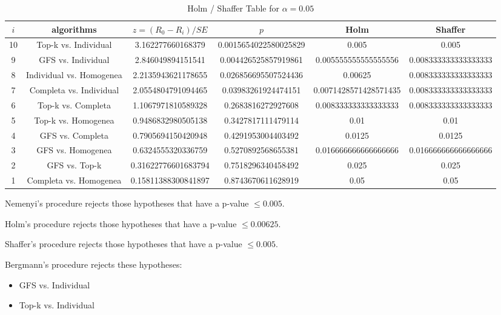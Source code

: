 \documentclass[a4paper,10pt]{article}
\begin{document}
\begin{landscape}
\begin{table}[!htp]
\centering\tiny
\caption{Holm / Shaffer Table for $\alpha=0.05$}
\begin{tabular}{cccccc}
$i$&algorithms&$z=(R_0 - R_i)/SE$&$p$&Holm&Shaffer\\
\hline
10&Top-k vs. Individual&3.162277660168379&0.0015654022580025829&0.005&0.005\\
9&GFS vs. Individual&2.846049894151541&0.004426525857919861&0.005555555555555556&0.008333333333333333\\
8&Individual vs. Homogenea&2.2135943621178655&0.026856695507524436&0.00625&0.008333333333333333\\
7&Completa vs. Individual&2.0554804791094465&0.03983261924474151&0.0071428571428571435&0.008333333333333333\\
6&Top-k vs. Completa&1.1067971810589328&0.2683816272927608&0.008333333333333333&0.008333333333333333\\
5&Top-k vs. Homogenea&0.9486832980505138&0.3427817111479114&0.01&0.01\\
4&GFS vs. Completa&0.7905694150420948&0.4291953004403492&0.0125&0.0125\\
3&GFS vs. Homogenea&0.6324555320336759&0.5270892568655381&0.016666666666666666&0.016666666666666666\\
2&GFS vs. Top-k&0.31622776601683794&0.7518296340458492&0.025&0.025\\
1&Completa vs. Homogenea&0.15811388300841897&0.8743670611628919&0.05&0.05\\
\hline
\end{tabular}
\end{table}
Nemenyi's procedure rejects those hypotheses that have a p-value $\le0.005$.


Holm's procedure rejects those hypotheses that have a p-value $\le0.00625$.


Shaffer's procedure rejects those hypotheses that have a p-value $\le0.005$.


Bergmann's procedure rejects these hypotheses:


\begin{itemize}


\item GFS vs. Individual
\item Top-k vs. Individual
\end{itemize}



\end{landscape}
\end{document}
